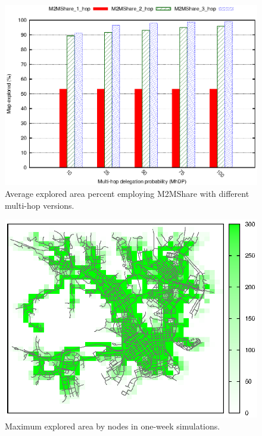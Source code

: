 \begin{figure}[htpb]
  \begin{center}
    \includegraphics{grafici/mapCovered_MultiHop.eps}
    \caption{Average explored area percent employing M2MShare with different multi-hop versions.}
    \label{fig:mapCoverage_MultiHop}
  \end{center}
\end{figure}

\begin{figure}[htpb]
  \begin{center}
    \includegraphics[scale=0.85]{grafici/mappe/controlSet.eps}
    \caption{Maximum explored area by nodes in one-week simulations.}
    \label{fig:mapCoverage_controlSet}
  \end{center}
\end{figure}


